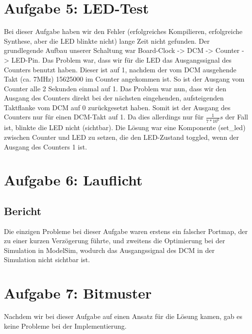\documentclass[parskip=full]{scrartcl}
\begin{document}
	\section*{Aufgabe 5: LED-Test}
		\setcounter{section}{5}
		\setcounter{subsection}{0}
		Bei dieser Aufgabe haben wir den Fehler (erfolgreiches Kompilieren, erfolgreiche Synthese, aber die LED blinkte nicht) lange Zeit nicht gefunden. Der grundlegende Aufbau unserer Schaltung war Board-Clock -> DCM -> Counter -> LED-Pin. Das Problem war, dass wir für die LED das Ausgangssignal des Counters benutzt haben. Dieser ist auf 1, nachdem der vom DCM ausgehende Takt (ca. 7MHz) 15625000 im Counter angekommen ist. So ist der Ausgang vom Counter alle 2 Sekunden einmal auf 1. Das Problem war nun, dass wir den Ausgang des Counters direkt bei der nächsten eingehenden, aufsteigenden Taktflanke vom DCM auf 0 zurückgesetzt haben. Somit ist der Ausgang des Counters nur für einen DCM-Takt auf 1. Da dies allerdings nur für $\frac{1}{7*10^6}s$ der Fall ist, blinkte die LED nicht (sichtbar). Die Lösung war eine Komponente (set\_led) zwischen Counter und LED zu setzen, die den LED-Zustand toggled, wenn der Ausgang des Counters 1 ist.
	\section*{Aufgabe 6: Lauflicht}
		\subsection{Bericht}
			Die einzigen Probleme bei dieser Aufgabe waren erstens ein falscher Portmap, der zu einer kurzen Verzögerung führte, und zweitens die Optimierung bei der Simulation in ModelSim, wodurch das Ausgangssignal des DCM in der Simulation nicht sichtbar ist.
	\section*{Aufgabe 7: Bitmuster}
		Nachdem wir bei dieser Aufgabe auf einen Ansatz für die Lösung kamen, gab es keine Probleme bei der Implementierung.
	
	
\end{document}

